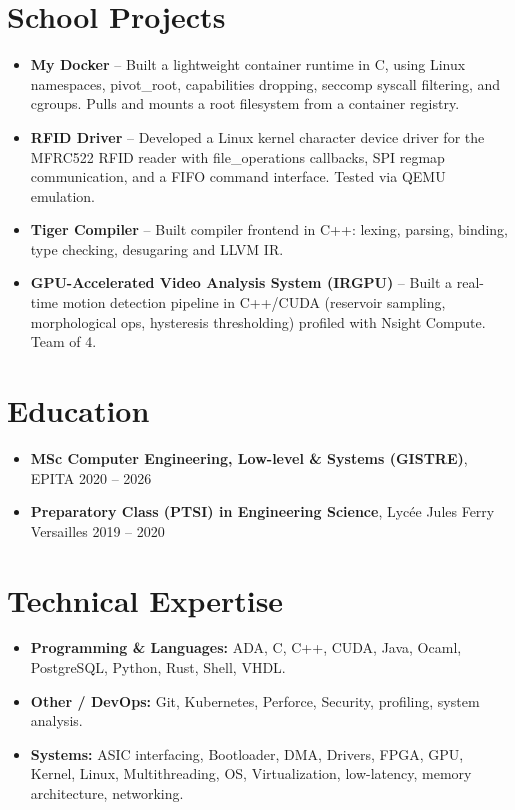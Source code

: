 \documentclass[9pt,a4paper]{article}
\begin{document}
\section*{School Projects}
\begin{tcolorbox}[mybox]
\begin{itemize}
\item \textbf{My Docker} -- Built a lightweight container runtime in C, using Linux namespaces, pivot\_root, capabilities dropping, seccomp syscall filtering, and cgroups. Pulls and mounts a root filesystem from a container registry.

\item \textbf{RFID Driver} -- Developed a Linux kernel character device driver for the MFRC522 RFID reader with file\_operations callbacks, SPI regmap communication, and a FIFO command interface. Tested via QEMU emulation.

\item \textbf{Tiger Compiler} -- Built compiler frontend in C++: lexing, parsing, binding, type checking, desugaring and LLVM IR.

\item \textbf{GPU-Accelerated Video Analysis System (IRGPU)} -- Built a real-time motion detection pipeline in C++/CUDA (reservoir sampling, morphological ops, hysteresis thresholding) profiled with Nsight Compute. Team of 4.
\end{itemize}
\end{tcolorbox}


\section*{Education}
\begin{tcolorbox}[mybox]
\begin{itemize}
\item \textbf{MSc Computer Engineering, Low-level \& Systems (GISTRE)}, EPITA {\small{\hfill 2020 – 2026}}

\item \textbf{Preparatory Class (PTSI) in Engineering Science}, Lycée Jules Ferry Versailles {\small{\hfill 2019 – 2020}}
\end{itemize}
\end{tcolorbox}


\section*{Technical Expertise}
\begin{tcolorbox}[mybox]
\begin{itemize}
\item \textbf{Programming \& Languages:} ADA, C, C++, CUDA, Java, Ocaml, PostgreSQL, Python, Rust, Shell, VHDL.

\item \textbf{Other / DevOps:} Git, Kubernetes, Perforce, Security, profiling, system analysis.

\item \textbf{Systems:} ASIC interfacing, Bootloader, DMA, Drivers, FPGA, GPU, Kernel, Linux, Multithreading, OS, Virtualization, low-latency, memory architecture, networking.
\end{itemize}
\end{tcolorbox}
\end{document}
